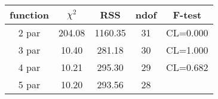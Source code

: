 \begin{tabular}{c|c|c|c|c}
function & $\chi^2$ & RSS & ndof & F-test \\
\hline
2 par & 204.08 & 1160.35 & 31 & CL=0.000 \\
3 par & 10.40 & 281.18 & 30 & CL=1.000 \\
4 par & 10.21 & 295.30 & 29 & CL=0.682 \\
5 par & 10.20 & 293.56 & 28 & \\
\hline
\end{tabular}
